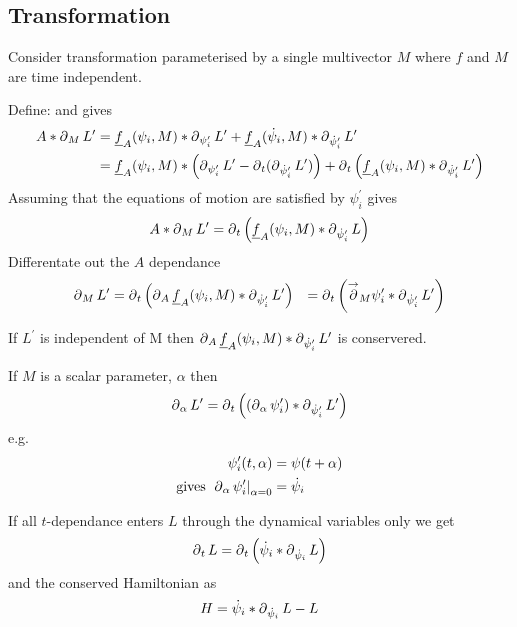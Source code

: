 \subsection{Transformation}
Consider transformation parameterised by a single multivector $M$
where $f$ and $M$ are time independent.

Define:
and
gives
\begin{align}
A\ast\operatorname{\partial}_M L^\prime &=
 \underline{f}_A(\psi_i, M) \ast \operatorname{\partial}_{\psi_i^\prime} L^\prime + 
 \underline{f}_A(\dot{\psi}_i, M) \ast \operatorname{\partial}_{\dot{\psi}_i^\prime}L^\prime
\\
&= \underline{f}_A(\psi_i, M)\ast\left(\operatorname{\partial}_{\psi_i^\prime} L^\prime -
 \operatorname{\partial}_t(\operatorname{\partial}_{\dot{\psi}_i^\prime} L^\prime)\right)
+ \operatorname{\partial}_t\left(\underline{f}_A(\psi_i, M) \ast \operatorname{\partial}_{\dot{\psi}_i^\prime}L^\prime\right)
\end{align}
Assuming that the equations of motion are satisfied by $\psi_i^\prime$
gives
\begin{align}
A\ast\operatorname{\partial}_M L^\prime = \operatorname{\partial}_t\left(\underline{f}_A(\psi_i, M) \ast
 \operatorname{\partial}_{\dot{\psi}_i^\prime} L\right)
\end{align}
Differentate out the $A$ dependance
\begin{align}
 \operatorname{\partial}_M L^\prime &= \operatorname{\partial}_t \left( \operatorname{\partial}_A \underline{f}_A (\psi_i, M) \ast \operatorname{\partial}_{\dot{\psi}_i^\prime}L^\prime\right)
&= \operatorname{\partial}_t\left({\stackrel{\rightarrow}{\operatorname{\partial}}}_M \psi_i^\prime \ast \operatorname{\partial}_{\dot{\psi}_i^\prime}L^\prime\right)
\end{align}

If $L^\prime$ is independent of M then
 $\operatorname{\partial}_A \underline{f}_A(\psi_i, M)\ast\operatorname{\partial}_{\dot{\psi}_i^\prime}L^\prime$ is
 conservered.

If $M$ is a scalar parameter, $\alpha$ then
\begin{align}
 \operatorname{\partial}_\alpha L^\prime = \operatorname{\partial}_t \left( (\operatorname{\partial}_\alpha \psi_i^\prime)\ast \operatorname{\partial}_{\dot{\psi}_i^\prime}L^\prime \right)
\end{align}
e.g.
\begin{align}
\psi_i^\prime(t,\alpha) &= \psi(t+\alpha)\\
\text{gives } \left.{\operatorname{\partial}_\alpha \psi_i^\prime}\right|_{\alpha = 0} &= \dot{\psi}_i
\end{align}

If all $t$-dependance enters $L$ through the dynamical variables only we
get
\begin{align}
\operatorname{\partial}_t L = \operatorname{\partial}_t \left(\dot{\psi}_i \ast \operatorname{\partial}_{\dot{\psi}_i} L\right)
\end{align}
and the conserved Hamiltonian as
\begin{align}
 H = \dot{\psi}_i \ast \operatorname{\partial}_{\dot{\psi}_i}L - L
\end{align}

